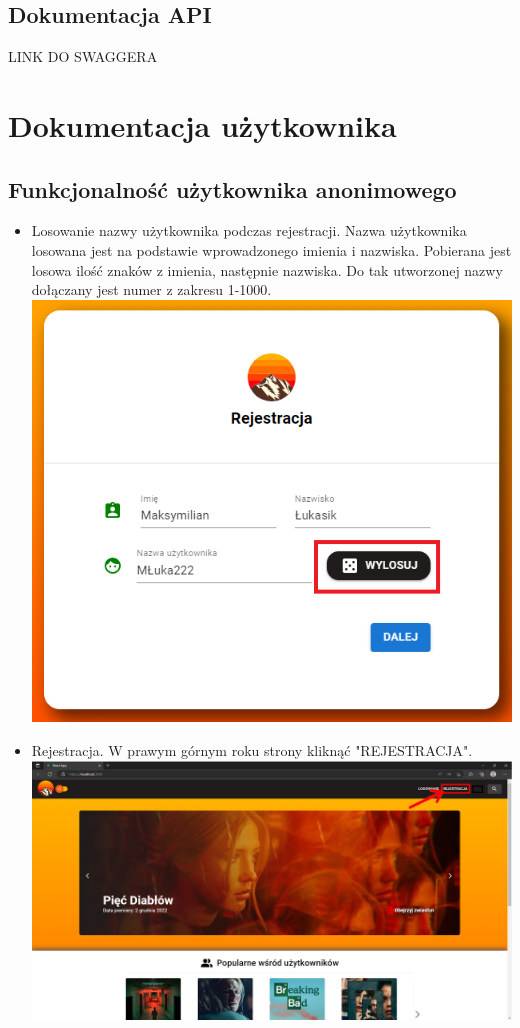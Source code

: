 \documentclass[12pt]{article}
\begin{document}
\begin{flushleft}
		\subsection{Dokumentacja API}	%
		LINK DO SWAGGERA
\pagebreak
			
	\section{Dokumentacja użytkownika}
		\subsection{Funkcjonalność użytkownika anonimowego}
		\begin{itemize}
			\item Losowanie nazwy użytkownika podczas rejestracji.		
			Nazwa użytkownika losowana jest na podstawie wprowadzonego imienia i nazwiska. Pobierana jest losowa ilość znaków z imienia, następnie nazwiska. Do tak utworzonej nazwy dołączany jest numer z zakresu 1-1000.
			\includegraphics[scale=0.3]{WylosowanieNazwy.png} \linebreak
			\item Rejestracja.
			W prawym górnym roku strony kliknąć "REJESTRACJA". \linebreak
			\includegraphics[scale=0.3]{Rejestracja1.png} \linebreak

\end{itemize}
\end{flushleft}
\end{document}
